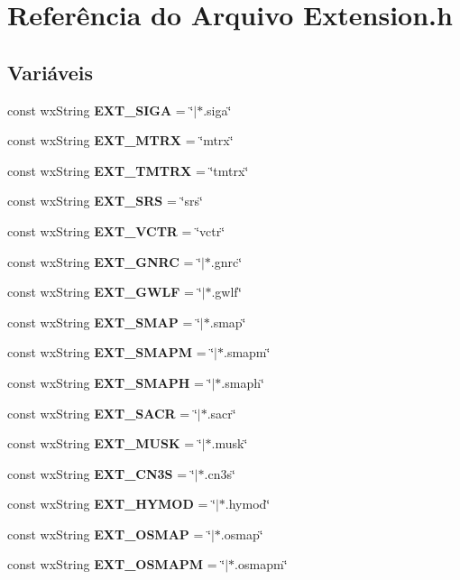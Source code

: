 \section{Referência do Arquivo Extension.\+h}
\label{_extension_8h}
\subsection*{Variáveis}
\begin{DoxyCompactItemize}
\item 
const wx\+String {\bf E\+X\+T\+\_\+\+S\+I\+GA} = \char`\"{}$\vert$$\ast$.siga\char`\"{}
\item 
const wx\+String {\bf E\+X\+T\+\_\+\+M\+T\+RX} = \char`\"{}mtrx\char`\"{}
\item 
const wx\+String {\bf E\+X\+T\+\_\+\+T\+M\+T\+RX} = \char`\"{}tmtrx\char`\"{}
\item 
const wx\+String {\bf E\+X\+T\+\_\+\+S\+RS} = \char`\"{}srs\char`\"{}
\item 
const wx\+String {\bf E\+X\+T\+\_\+\+V\+C\+TR} = \char`\"{}vctr\char`\"{}
\item 
const wx\+String {\bf E\+X\+T\+\_\+\+G\+N\+RC} = \char`\"{}$\vert$$\ast$.gnrc\char`\"{}
\item 
const wx\+String {\bf E\+X\+T\+\_\+\+G\+W\+LF} = \char`\"{}$\vert$$\ast$.gwlf\char`\"{}
\item 
const wx\+String {\bf E\+X\+T\+\_\+\+S\+M\+AP} = \char`\"{}$\vert$$\ast$.smap\char`\"{}
\item 
const wx\+String {\bf E\+X\+T\+\_\+\+S\+M\+A\+PM} = \char`\"{}$\vert$$\ast$.smapm\char`\"{}
\item 
const wx\+String {\bf E\+X\+T\+\_\+\+S\+M\+A\+PH} = \char`\"{}$\vert$$\ast$.smaph\char`\"{}
\item 
const wx\+String {\bf E\+X\+T\+\_\+\+S\+A\+CR} = \char`\"{}$\vert$$\ast$.sacr\char`\"{}
\item 
const wx\+String {\bf E\+X\+T\+\_\+\+M\+U\+SK} = \char`\"{}$\vert$$\ast$.musk\char`\"{}
\item 
const wx\+String {\bf E\+X\+T\+\_\+\+C\+N3S} = \char`\"{}$\vert$$\ast$.cn3s\char`\"{}
\item 
const wx\+String {\bf E\+X\+T\+\_\+\+H\+Y\+M\+OD} = \char`\"{}$\vert$$\ast$.hymod\char`\"{}
\item 
const wx\+String {\bf E\+X\+T\+\_\+\+O\+S\+M\+AP} = \char`\"{}$\vert$$\ast$.osmap\char`\"{}
\item 
const wx\+String {\bf E\+X\+T\+\_\+\+O\+S\+M\+A\+PM} = \char`\"{}$\vert$$\ast$.osmapm\char`\"{}

\end{DoxyCompactItemize}
